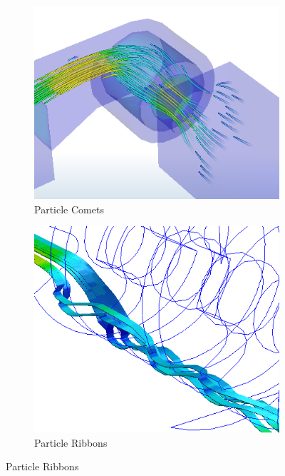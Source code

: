 \begin{figure}[p]
    \centering
    \begin{subfigure}{0.45\textwidth}%
        \includegraphics[width=\linewidth]{Ch20Research/figures/autodesk_particle_comets.png}%
        \caption{Particle Comets}%
    \end{subfigure}%
    \begin{subfigure}{0.45\textwidth}%
        \includegraphics[width=\linewidth]{Ch20Research/figures/autodesk_particle_ribbons.png}%
        \caption{Particle Ribbons}%
    \end{subfigure}
    

\end{figure}
